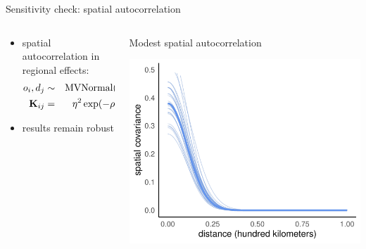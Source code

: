 \documentclass{beamer}
\begin{document}
\begin{frame}{Sensitivity check: spatial autocorrelation}
			\begin{columns}
		\begin{column}{0.5\textwidth}
			\begin{itemize}
				  \item spatial autocorrelation in regional effects:
					\begin{eqnarray*}
					  o_{i}, d_{j}& \sim &\text{MVNormal}(0, \mathbf{K})\\
					  \mathbf{K}_{ij} & = & \eta^{2}\exp(-\rho^{2}\mathbf{D}_{ij}) \newline
					\end{eqnarray*}
					\item results remain robust
					\pause
				  \end{itemize}
		\end{column}
		\begin{column}{0.5\textwidth}
			\alert{Modest} spatial autocorrelation
			\begin{center}
				\includegraphics[width=\textwidth]{../../fig/spatial_autocorrelation}
			\end{center}
		\end{column}
	\end{columns}
\end{frame}
\end{document}
